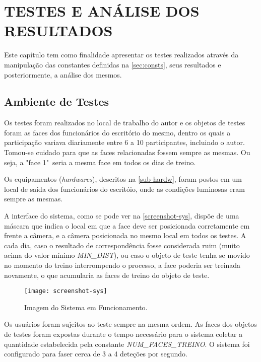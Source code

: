 
\chapter{TESTES E ANÁLISE DOS RESULTADOS}\label{ch:resultados}

Este capítulo tem como finalidade apresentar os testes realizados através da manipulação das constantes definidas na \autoref{sec:consts}, seus resultados e posteriormente, a análise dos mesmos.

\section{Ambiente de Testes}\label{sec:ambtest}

Os testes foram realizados no local de trabalho do autor e os objetos de testes foram as faces dos funcionários do escritório do mesmo, dentro os quais a participação variava diariamente entre 6 a 10 participantes, incluindo o autor. Tomou-se cuidado para que as faces relacionadas fossem sempre as mesmas. Ou seja, a "face 1"\ seria a mesma face em todos os dias de treino.

Os equipamentos (\textit{hardwares}), descritos na \autoref{sub-hardw}, foram postos em um local de saída dos funcionários do escritóio, onde as condições luminosas eram sempre as mesmas.

A interface do sistema, como se pode ver na \autoref{screenshot-sys}, dispõe de uma máscara que indica o local em que a face deve ser posicionada corretamente em frente a câmera, e a câmera posicionada no mesmo local em todos os testes. A cada dia, caso o resultado de correspondência fosse considerada ruim (muito acima do valor mínimo \textit{MIN\_DIST}), ou caso o objeto de teste tenha se movido no momento do treino interrompendo o processo, a face poderia ser treinada novamente, o que acumularia as faces de treino do objeto de teste.

\begin{figure}[h]
	\centering
	\texttt{[image: screenshot-sys]}
	\caption{Imagem do Sistema em Funcionamento.}
	\label{screenshot-sys}
\end{figure}

Os usuários foram sujeitos ao teste sempre na mesma ordem. As faces dos objetos de testes foram expostas durante o tempo necessário para o sistema coletar a quantidade estabelecida pela constante \textit{NUM\_FACES\_TREINO}. O sistema foi configurado para faser cerca de 3 a 4 deteções por segundo.

